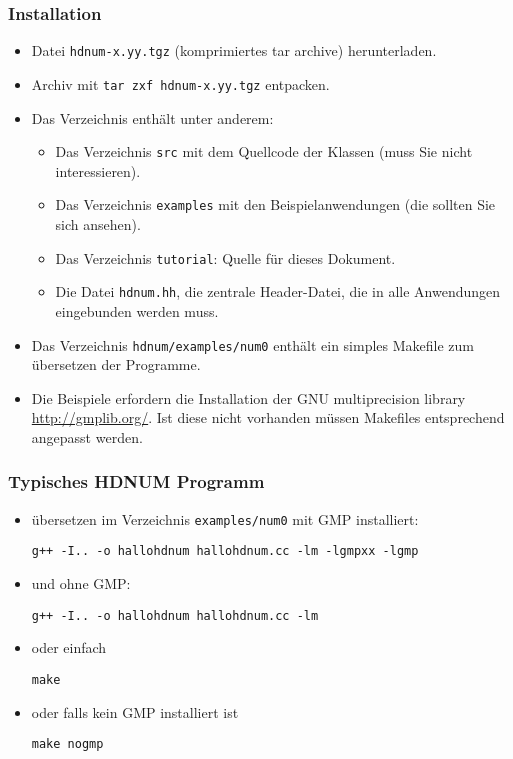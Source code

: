 \begin{frame}
\frametitle{Installation}
\begin{itemize}
\item Datei \lstinline{hdnum-x.yy.tgz} (komprimiertes tar archive)
  herunterladen.
\item Archiv mit \lstinline{tar zxf hdnum-x.yy.tgz} entpacken.
\item Das Verzeichnis enthält unter anderem:
\begin{itemize}
\item Das Verzeichnis \lstinline{src} mit dem Quellcode der Klassen
  (muss Sie nicht interessieren).
\item Das Verzeichnis \lstinline{examples} mit den Beispielanwendungen
  (die sollten Sie sich ansehen).
\item Das Verzeichnis \lstinline{tutorial}: Quelle für dieses Dokument.
\item Die Datei \lstinline{hdnum.hh}, die zentrale Header-Datei, die
  in alle Anwendungen eingebunden werden muss.
\end{itemize}
\item Das Verzeichnis \lstinline{hdnum/examples/num0} enthält ein simples
  Makefile zum übersetzen der Programme.
\item Die Beispiele erfordern die Installation der GNU
  multiprecision library \url{http://gmplib.org/}. Ist diese nicht
  vorhanden müssen Makefiles entsprechend angepasst werden.
\end{itemize}

\end{frame}

\begin{frame}
\frametitle{Typisches HDNUM Programm}



\begin{itemize}
\item übersetzen im Verzeichnis \lstinline{examples/num0} mit GMP installiert:

{\footnotesize\lstinline{g++ -I.. -o hallohdnum hallohdnum.cc -lm -lgmpxx -lgmp}}
\item und ohne GMP:

{\footnotesize\lstinline{g++ -I.. -o hallohdnum hallohdnum.cc -lm}}
\item oder einfach

{\footnotesize\lstinline{make}}
\item oder falls kein GMP installiert ist

{\footnotesize\lstinline{make nogmp}}
\end{itemize}
\end{frame}
